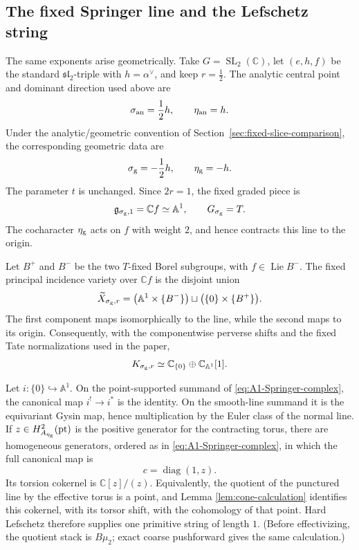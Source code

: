 \documentclass[11pt]{amsart}
\theoremstyle{definition}
\theoremstyle{remark}
\begin{document}
\subsection{The fixed Springer line and the Lefschetz string}

The same exponents arise geometrically.  Take
$G=\operatorname{SL}_2(\mathbb C)$, let $(e,h,f)$ be the standard
$\mathfrak{sl}_2$-triple with $h=\alpha^\vee$, and keep $r=\tfrac12$.
The analytic central point and dominant direction used above are
\[
 \sigma_{\rm an}=\frac12h,\qquad \eta_{\rm an}=h.
\]
Under the analytic/geometric convention of Section~\ref{sec:fixed-slice-comparison}, the
corresponding geometric data are
\[
 \sigma_{\rm g}=-\frac12h,\qquad \eta_{\rm g}=-h.
\]
The parameter $t$ is unchanged.  Since $2r=1$, the fixed graded piece is
\[
 \mathfrak g_{\sigma_{\rm g},1}=\mathbb Cf\simeq\mathbb A^1,
 \qquad G_{\sigma_{\rm g}}=T.
\]
The cocharacter $\eta_{\rm g}$ acts on $f$ with weight $2$, and hence
contracts this line to the origin.

Let $B^+$ and $B^-$ be the two $T$-fixed Borel subgroups, with
$f\in\operatorname{Lie}B^-$.  The fixed principal incidence variety over
$\mathbb Cf$ is the disjoint union
\[
 \widetilde X_{\sigma_{\rm g},r}
 =\bigl(\mathbb A^1\times\{B^-\}\bigr)
  \sqcup\bigl(\{0\}\times\{B^+\}\bigr).
\]
The first component maps isomorphically to the line, while the second maps
to its origin.  Consequently, with the componentwise perverse shifts and
the fixed Tate normalizations used in the paper,
\begin{equation}\label{eq:A1-Springer-complex}
 K_{\sigma_{\rm g},r}
 \simeq \mathbb C_{\{0\}}\oplus\mathbb C_{\mathbb A^1}[1].
\end{equation}

Let $i:\{0\}\hookrightarrow\mathbb A^1$.  On the point-supported summand
of \eqref{eq:A1-Springer-complex}, the canonical map $i^!\to i^*$ is the
identity.  On the smooth-line summand it is the equivariant Gysin map, hence
multiplication by the Euler class of the normal line.  If
$z\in H^2_{A_{\eta_{\rm g}}}(\mathrm{pt})$ is the positive generator for
the contracting torus, there are homogeneous generators, ordered as in
\eqref{eq:A1-Springer-complex}, in which
the full canonical map is
\begin{equation}\label{eq:A1-geometric-map}
 c=\operatorname{diag}(1,z).
\end{equation}
Its torsion cokernel is $\mathbb C[z]/(z)$.  Equivalently, the quotient of
the punctured line by the effective torus is a point, and Lemma
\ref{lem:cone-calculation} identifies this cokernel, with its torsor shift,
with the cohomology of that point.  Hard Lefschetz therefore supplies one
primitive string of length $1$.  (Before effectivizing, the quotient stack
is $B\mu_2$; exact coarse pushforward gives the same calculation.)
\end{document}
